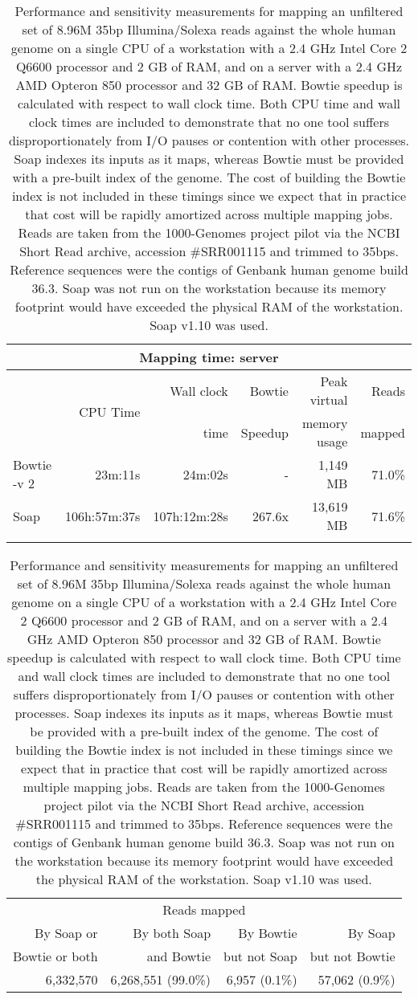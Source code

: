 \documentclass[letterpaper]{article}
\begin{document}
\begin{table}[tp]
\scriptsize
\begin{tabular*}{1.00\textwidth}{@{\extracolsep{\fill}} lrrrrr}
\multicolumn{6}{c}{\small{Mapping time: server}} \\[3pt]
\toprule
 & \multirow{2}{*}{CPU Time} & Wall clock & Bowtie  & Peak virtual & Reads  \\
 &                            & time       & Speedup & memory usage & mapped \\[3pt]
\toprule
Bowtie -v 2 & 23m:11s & 24m:02s & - & 1,149 MB & 71.0\%\\\midrule
Soap & 106h:57m:37s & 107h:12m:28s & 267.6x & 13,619 MB & 71.6\%\\
\bottomrule\\[1pt]
\end{tabular*}
\begin{tabular*}{1.00\textwidth}{@{\extracolsep{\fill}} rrrr}
\multicolumn{4}{c}{\small{Reads mapped}} \\[3pt] 
By Soap or     & By both Soap & By Bowtie    & By Soap         \\ 
Bowtie or both & and Bowtie   & but not Soap & but not Bowtie \\ 
\toprule
6,332,570 & 6,268,551 (99.0\%) & 6,957 (0.1\%) & 57,062 (0.9\%) \\ 
\bottomrule
\end{tabular*}
\caption{Performance and sensitivity measurements for mapping an unfiltered
set of 8.96M 35bp Illumina/Solexa reads
against the whole human genome on a single CPU of a workstation with a 2.4 GHz
Intel Core 2 Q6600 processor and 2 GB of RAM, and on a server with a 2.4 GHz
AMD Opteron 850 processor and 32 GB of RAM. Bowtie speedup is calculated with
respect to wall clock time. Both CPU time and wall clock times are included to
demonstrate that no one tool suffers disproportionately from I/O pauses or
contention with other processes. Soap indexes its inputs
as it maps, whereas Bowtie must be provided with a pre-built index of the
genome.  The cost of building the Bowtie index is not included in these timings
since we expect that in practice that cost will be rapidly amortized across
multiple mapping jobs. Reads are taken from the 1000-Genomes project pilot via
the NCBI Short Read archive, accession \#SRR001115 and trimmed to 35bps.
Reference sequences were the contigs of Genbank human genome build 36.3. Soap
was not run on the workstation because its memory footprint would have exceeded
the physical RAM of the workstation. Soap v1.10 was used. }
\end{table}
\end{document}

